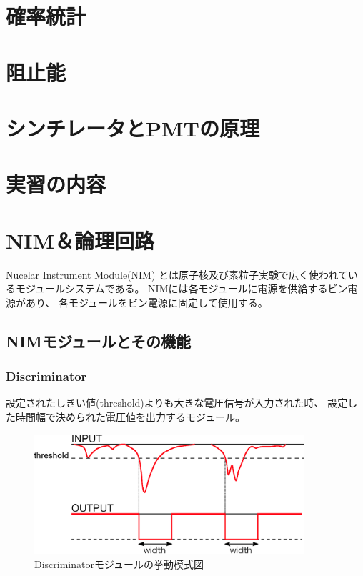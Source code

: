 \documentclass{jarticle}
\begin{document}
  \section{確率統計}
  \section{阻止能}
  \section{シンチレータとPMTの原理}
  

  \section{実習の内容}
  
  \clearpage 
  
  \section{NIM＆論理回路}
  Nucelar Instrument Module(NIM) とは原子核及び素粒子実験で広く使われているモジュールシステムである。
  NIMには各モジュールに電源を供給するビン電源があり、
  各モジュールをビン電源に固定して使用する。
  
  
  \subsection{NIMモジュールとその機能}

    \subsubsection*{Discriminator}
	  
	  設定されたしきい値(threshold)よりも大きな電圧信号が入力された時、
	  設定した時間幅で決められた電圧値を出力するモジュール。
 	  
	  \begin{figure}[htbp]
	   \begin{center}
	    \includegraphics[width = 100mm]{./picture/Discriminator.eps}
	   \end{center}
	   \caption{Discriminatorモジュールの挙動模式図}
	   \label{Fig:Discri}
	  \end{figure}
	  
\end{document}
